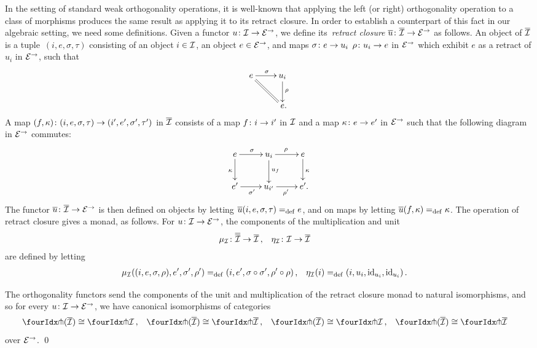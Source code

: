 \documentclass[reqno,10pt,a4paper,oneside,draft]{amsart}
\begin{document}
In the setting of standard weak orthogonality operations, it is well-known that applying the left (or right) orthogonality operation to a class of morphisms produces the same result as applying it to its retract closure.
In order to establish a counterpart of this fact in our algebraic setting, we need some definitions.
Given a functor $u \co \cal{I} \to \calE^\to$, we define its~\emph{retract closure} $\overline{u} \co \overline{\cal{I}} \to \catE^\to$ as follows.
An object of $\overline{\cal{I}}$ is a tuple~$(i, e, \sigma, \tau)$ consisting of an object $i \in \cal{I}$, an object $e \in \catE^\to$, and maps $\sigma \co e \rightarrow u_i$ $\rho \co u_i \rightarrow e$ in $\catE^\to$ which exhibit $e$ as a retract of $u_i$ in $\catE^\to$, \ie such that
\[
\xymatrix{
  e
  \ar[r]^{\sigma}
  \ar@{=}[dr]
&
  u_i
  \ar[d]^{\rho}
\\&
  e
\rlap{.}}
\]
A map $(f, \kappa) \co (i, e, \sigma, \tau) \to (i', e', \sigma', \tau')$ in $\overline{\cal{I}}$ consists of a map $f \co i \to i'$ in $\cal{I}$ and a map $\kappa \co e \rightarrow e'$ in $\catE^\to$ such that the following diagram in $\catE^\to$ commutes:
\[
\xymatrix{
  e
  \ar[r]^{\sigma}
  \ar[d]_{\kappa}
&
  u_i
  \ar[r]^{\rho}
  \ar[d]^{u_f}
&
  e
  \ar[d]^{\kappa}
\\
  e'
  \ar[r]_{\sigma'}
&
  u_{i'}
  \ar[r]_{\rho'}
&
  e'
\rlap{.}}
\]
The functor $\overline{u} \co \overline{\cal{I}} \to \catE^\to$ is then defined on objects by letting $\overline{u}(i, e, \sigma, \tau) \defeq e$, and on maps by letting $\overline{u}(f, \kappa) \defeq \kappa$.
The operation of retract closure gives a monad, as follows. For $u \co \cal{I} \to \catE^\to$, the components of the multiplication and unit
\[
\begin{aligned}
  \mu_\cal{I} &\co \overline{\overline{\cal{I}}} \to \overline{\cal{I}}
\, , &
  \eta_\cal{I} &\co \cal{I} \to \overline{\cal{I}}
\end{aligned}
\]
are defined by letting
\[
\begin{aligned}
  \mu_\cal{I}((i, e, \sigma, \rho), e', \sigma', \rho') &\defeq (i, e', \sigma \cc \sigma', \rho' \cc \rho)
\, , &
  \eta_\cal{I}(i) &\defeq (i, u_i, \id_{u_i}, \id_{u_i})
\, .
\end{aligned}
\]

\begin{proposition} \label{retract-closure}
The orthogonality functors send the components of the unit and multiplication of the retract closure monad to natural isomorphisms, and so for every $u \co \cal{I} \to \catE^\to$, we have canonical isomorphisms of categories
\[
\begin{aligned}
  \liftr{(\overline{\cal{I}})} &\iso \liftr{\cal{I}}
\, ,&
  \liftr{(\overline{\overline{\cal{I}}})} &\iso \liftr{\overline{\cal{I}}}
\, ,&
  \liftl{(\overline{\cal{I}})} &\iso \liftl{\cal{I}}
\, ,&
 \liftl{(\overline{\overline{\cal{I}}})} &\iso \liftl{\overline{\cal{I}}}
\end{aligned}
\]
over $\catE^\to$.
\qed
\end{proposition}
\end{document}
